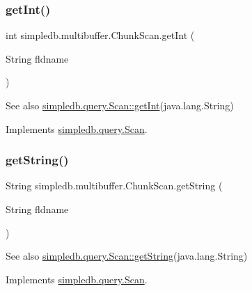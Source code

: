 \subsubsection{\texorpdfstring{get\+Int()}{getInt()}}
{\footnotesize\ttfamily int simpledb.\+multibuffer.\+Chunk\+Scan.\+get\+Int (\begin{DoxyParamCaption}\item[{String}]{fldname }\end{DoxyParamCaption})\hspace{0.3cm}{\ttfamily [inline]}}

\begin{DoxySeeAlso}{See also}
\hyperlink{interfacesimpledb_1_1query_1_1Scan_a2e064555e16240115167b5d42d2b3d19}{simpledb.\+query.\+Scan\+::get\+Int}(java.\+lang.\+String) 
\end{DoxySeeAlso}


Implements \hyperlink{interfacesimpledb_1_1query_1_1Scan_a2e064555e16240115167b5d42d2b3d19}{simpledb.\+query.\+Scan}.

\mbox{\label{classsimpledb_1_1multibuffer_1_1ChunkScan_aa66edd9026c2c2f92015d3d6c2b9c932}} 
\subsubsection{\texorpdfstring{get\+String()}{getString()}}
{\footnotesize\ttfamily String simpledb.\+multibuffer.\+Chunk\+Scan.\+get\+String (\begin{DoxyParamCaption}\item[{String}]{fldname }\end{DoxyParamCaption})\hspace{0.3cm}{\ttfamily [inline]}}

\begin{DoxySeeAlso}{See also}
\hyperlink{interfacesimpledb_1_1query_1_1Scan_a922e219fee53ecfa6163525f9e3ef222}{simpledb.\+query.\+Scan\+::get\+String}(java.\+lang.\+String) 
\end{DoxySeeAlso}


Implements \hyperlink{interfacesimpledb_1_1query_1_1Scan_a922e219fee53ecfa6163525f9e3ef222}{simpledb.\+query.\+Scan}.

\mbox{\label{classsimpledb_1_1multibuffer_1_1ChunkScan_a8c5c7202add0289c7fc15f036332db96}} 
